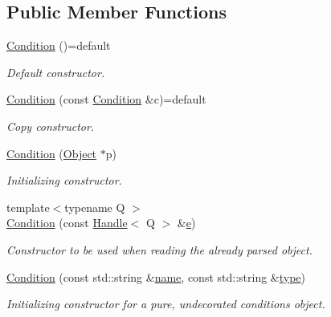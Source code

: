 \subsection*{Public Member Functions}
\begin{DoxyCompactItemize}
\item 
\hyperlink{class_d_d4hep_1_1_conditions_1_1_condition_a3d58e61c7c8a890d2b9d8e0fbd531937}{Condition} ()=default
\begin{DoxyCompactList}\small\item\em Default constructor. \end{DoxyCompactList}\item 
\hyperlink{class_d_d4hep_1_1_conditions_1_1_condition_a56a1f2ad3a8848b0b2453993b5492fd9}{Condition} (const \hyperlink{class_d_d4hep_1_1_conditions_1_1_condition}{Condition} \&c)=default
\begin{DoxyCompactList}\small\item\em Copy constructor. \end{DoxyCompactList}\item 
\hyperlink{class_d_d4hep_1_1_conditions_1_1_condition_a6bd06500c7a9dce845e676d6370ad3c3}{Condition} (\hyperlink{class_d_d4hep_1_1_conditions_1_1_condition_a6fc8dae0dad41db6a237920c85f8a55d}{Object} $\ast$p)
\begin{DoxyCompactList}\small\item\em Initializing constructor. \end{DoxyCompactList}\item 
{\footnotesize template$<$typename Q $>$ }\\\hyperlink{class_d_d4hep_1_1_conditions_1_1_condition_adcc56a3880cb03ff766ee5312d06e2f5}{Condition} (const \hyperlink{class_d_d4hep_1_1_handle}{Handle}$<$ Q $>$ \&\hyperlink{_volumes_8cpp_a8a9a1f93e9b09afccaec215310e64142}{e})
\begin{DoxyCompactList}\small\item\em Constructor to be used when reading the already parsed object. \end{DoxyCompactList}\item 
\hyperlink{class_d_d4hep_1_1_conditions_1_1_condition_a277c98ec82a48b428fa0d92199cd9e67}{Condition} (const std\+::string \&\hyperlink{class_d_d4hep_1_1_conditions_1_1_condition_ac4ff098ddb6634b752b93e6acddc23c8}{name}, const std\+::string \&\hyperlink{class_d_d4hep_1_1_conditions_1_1_condition_ab7536a2d10c19c6d94f34e11b13f76c5}{type})
\begin{DoxyCompactList}\small\item\em Initializing constructor for a pure, undecorated conditions object. \end{DoxyCompactList}\item 

\end{DoxyCompactItemize}
